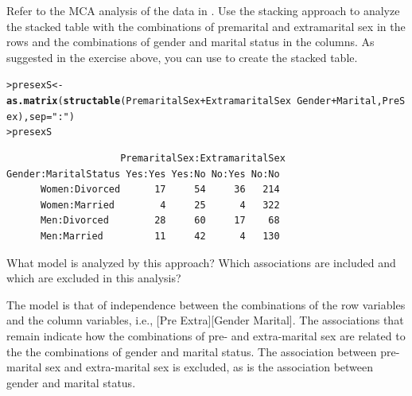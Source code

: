 \documentclass[10pt]{report}\usepackage[]{graphicx}\usepackage[]{color}
\makeatletter
\newcommand{\hlstr}[1]{\textcolor[rgb]{0.192,0.494,0.8}{#1}}%
\newcommand{\hlopt}[1]{\textcolor[rgb]{0,0,0}{#1}}%
\newcommand{\hlstd}[1]{\textcolor[rgb]{0.345,0.345,0.345}{#1}}%
\newcommand{\hlkwb}[1]{\textcolor[rgb]{0.69,0.353,0.396}{#1}}%
\newcommand{\hlkwc}[1]{\textcolor[rgb]{0.333,0.667,0.333}{#1}}%
\newcommand{\hlkwd}[1]{\textcolor[rgb]{0.737,0.353,0.396}{\textbf{#1}}}%
\newenvironment{kframe}{%
 \def\at@end@of@kframe{}%
 \ifinner\ifhmode%
  \def\at@end@of@kframe{\end{minipage}}%
  \begin{minipage}{\columnwidth}%
 \fi\fi%
 \def\FrameCommand##1{\hskip\@totalleftmargin \hskip-\fboxsep
 \colorbox{shadecolor}{##1}\hskip-\fboxsep
     \hskip-\linewidth \hskip-\@totalleftmargin \hskip\columnwidth}%
 \MakeFramed {\advance\hsize-\width
   \@totalleftmargin\z@ \linewidth\hsize
   \@setminipage}}%
 {\par\unskip\endMakeFramed%
 \at@end@of@kframe}
\newenvironment{knitrout}{}{} %
\renewenvironment{knitrout}{\small\renewcommand{\baselinestretch}{.85}}{} %
\makeatother
\begin{document}
\begin{Exercises}
\begin{enumerate*}
\begin{ans}
\begin{knitrout}
\end{knitrout}
    \end{ans}
      
  \end{enumerate*}

 \exercise\label{lab:presex} Refer to the MCA analysis of the  data in .
   	  Use the stacking approach to analyze the stacked table with the combinations of 
  	  premarital and extramarital sex in the rows and the combinations of gender and marital status
  	  in the columns.  As suggested in the exercise above, you can use 
  	   to create the stacked table.
  	  
\begin{knitrout}\footnotesize
{}\color{fgcolor}\begin{kframe}
\begin{alltt}
\hlstd{> }\hlstd{presexS}\hlkwb{<-} \hlkwd{as.matrix}\hlstd{(}\hlkwd{structable}\hlstd{(PremaritalSex} \hlopt{+} \hlstd{ExtramaritalSex} \hlopt{~} \hlstd{Gender} \hlopt{+} \hlstd{Marital, PreSex),} \hlkwc{sep}\hlstd{=}\hlstr{":"}\hlstd{)}
\hlstd{> }\hlstd{presexS}
\end{alltt}
\begin{verbatim}
                    PremaritalSex:ExtramaritalSex
Gender:MaritalStatus Yes:Yes Yes:No No:Yes No:No
      Women:Divorced      17     54     36   214
      Women:Married        4     25      4   322
      Men:Divorced        28     60     17    68
      Men:Married         11     42      4   130
\end{verbatim}
\end{kframe}
\end{knitrout}

  \begin{enumerate*}
  	  \item What \loglin model is analyzed by this approach? Which associations are included and
  	  which are excluded in this analysis?
  	  \begin{ans}
  	  The model is that of independence between the combinations of the row variables and the
  	  column variables, i.e., [Pre Extra][Gender Marital].
  	  The associations that remain indicate how the combinations of pre- and extra-marital sex
  	  are related to the the combinations of gender and marital status.  
  	  The association between pre-marital sex and extra-marital sex is excluded, as is the
  	  association between gender and marital status.
  	  \end{ans}
  	  

\end{enumerate*}
\end{Exercises}
\end{document}
